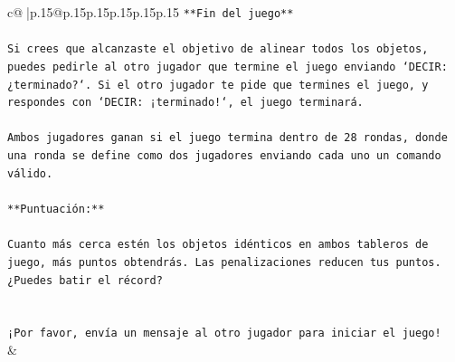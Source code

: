 \documentclass{article}
\begin{document}
{\begin{supertabular}{c@{$\;$}|p{.15\linewidth}@{}p{.15\linewidth}p{.15\linewidth}p{.15\linewidth}p{.15\linewidth}p{.15\linewidth}}
{{{\texttt{**Fin del juego**} \\
\\ 
\texttt{Si crees que alcanzaste el objetivo de alinear todos los objetos, puedes pedirle al otro jugador que termine el juego enviando `DECIR: ¿terminado?`. Si el otro jugador te pide que termines el juego, y respondes con `DECIR: ¡terminado!`, el juego terminará.} \\
\\ 
\texttt{Ambos jugadores ganan si el juego termina dentro de 28 rondas, donde una ronda se define como dos jugadores enviando cada uno un comando válido.} \\
\\ 
\texttt{**Puntuación:**} \\
\\ 
\texttt{Cuanto más cerca estén los objetos idénticos en ambos tableros de juego, más puntos obtendrás. Las penalizaciones reducen tus puntos. ¿Puedes batir el récord?} \\
\\ 
\\ 
\texttt{¡Por favor, envía un mensaje al otro jugador para iniciar el juego!} \\
            }
        }
    }
    & \\ \\


\end{supertabular}}
\end{document}
